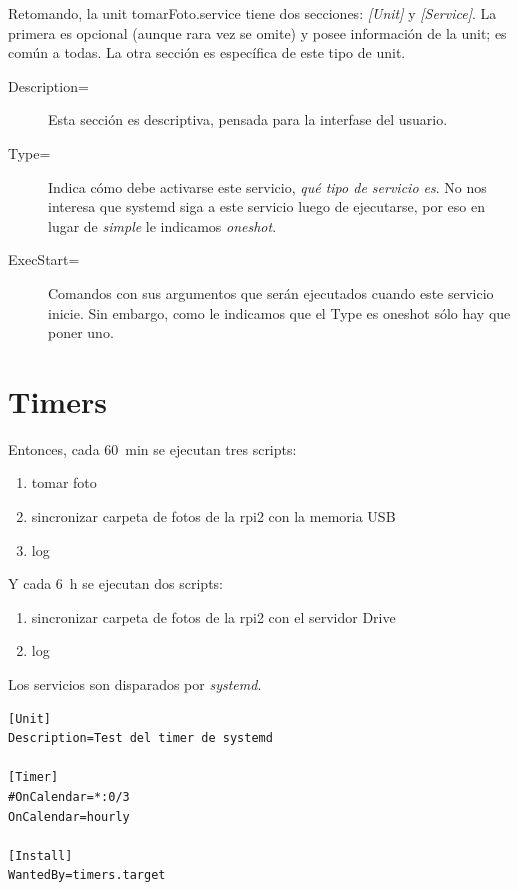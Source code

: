 \documentclass[10pt,a4paper]{article}
\begin{document}
Retomando, la unit tomarFoto.service tiene dos secciones: \emph{[Unit]} y \emph{[Service]}. La primera es opcional (aunque rara vez se omite) y posee informaci\'on de la unit; es com\'un a todas. La otra secci\'on es espec\'ifica de este tipo de unit. 

\begin{description}
    \item [Description=] Esta secci\'on es descriptiva, pensada para la interfase del usuario.
    \item [Type=] Indica c\'omo debe activarse este servicio, \emph{qu\'e tipo de servicio es}. No nos interesa que systemd siga a este servicio luego de ejecutarse, por eso en lugar de \emph{simple} le indicamos \emph{oneshot}.
    \item [ExecStart=] Comandos con sus argumentos que ser\'an ejecutados cuando este servicio inicie. Sin embargo, como le indicamos que el Type es oneshot s\'olo hay que poner uno.
\end{description}

\section{Timers}

Entonces, cada \SI{60}{min} se ejecutan tres scripts:
\begin{enumerate}
    \item tomar foto
    \item sincronizar carpeta de fotos de la rpi2 con la memoria USB
    \item log
\end{enumerate}

Y cada \SI{6}{h} se ejecutan dos scripts:
\begin{enumerate}
    \item sincronizar carpeta de fotos de la rpi2 con el servidor Drive
    \item log
\end{enumerate}

Los servicios son disparados por \emph{systemd}.

\begin{scriptsize}
\begin{mdframed}
\begin{verbatim}
[Unit]
Description=Test del timer de systemd

[Timer]
#OnCalendar=*:0/3
OnCalendar=hourly

[Install]
WantedBy=timers.target
\end{verbatim}
\end{mdframed}
\end{scriptsize}
\end{document}
